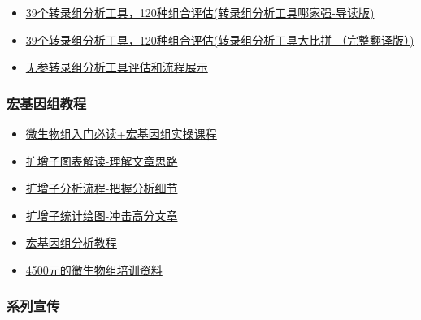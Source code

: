 \documentclass[]{article}
\providecommand{\tightlist}{%
  \setlength{\itemsep}{0pt}\setlength{\parskip}{0pt}}
\numberwithin{figure}{section}
\numberwithin{table}{section}
\begin{document}
\begin{itemize}
\tightlist
\item
  \href{http://mp.weixin.qq.com/s?__biz=MzI5MTcwNjA4NQ==\&mid=2247484106\&idx=1\&sn=687a0def51f6ea91a335754eb3dc9ca9\&chksm=ec0dc740db7a4e564e5b1e93a36e5d9447581e262eec9c2983d1d4e76788d673c9c07dec8f8e\#rd}{39个转录组分析工具，120种组合评估(转录组分析工具哪家强-导读版)}
\item
  \href{http://mp.weixin.qq.com/s?__biz=MzI5MTcwNjA4NQ==\&mid=2247484106\&idx=2\&sn=a09fa127d625c4072ae0343795346c56\&chksm=ec0dc740db7a4e56821f32f60700027c85db46e81089721d1bbe23ceefa86160d9661c2f2d4c\#rd}{39个转录组分析工具，120种组合评估(转录组分析工具大比拼 （完整翻译版）)}
\item
  \href{http://mp.weixin.qq.com/s/4HANWJY4oL7jGziroHfEpQ}{无参转录组分析工具评估和流程展示}
\end{itemize}

\hypertarget{ux5b8fux57faux56e0ux7ec4ux6559ux7a0b}{%
\subsubsection{宏基因组教程}\label{ux5b8fux57faux56e0ux7ec4ux6559ux7a0b}}

\begin{itemize}
\tightlist
\item
  \href{http://mp.weixin.qq.com/s/sQyl5EctXFB95Oxg8YIasg}{微生物组入门必读+宏基因组实操课程}
\item
  \href{http://mp.weixin.qq.com/s/oiVHO2S1JgYrKXPDU6fH2g}{扩增子图表解读-理解文章思路}
\item
  \href{http://mp.weixin.qq.com/s/KrYyy3jjzAL0rQzVfV6h4A}{扩增子分析流程-把握分析细节}
\item
  \href{http://mp.weixin.qq.com/s/6tNePiaDsPPzEBZjiCXIRg}{扩增子统计绘图-冲击高分文章}
\item
  \href{http://mp.weixin.qq.com/s/bcyvhFrNr6niqD13rQfZeg}{宏基因组分析教程}
\item
  \href{http://mp.weixin.qq.com/s/li7SdZVaCEyFQF8h6MMh2A}{4500元的微生物组培训资料}
\end{itemize}

\hypertarget{ux7cfbux5217ux5ba3ux4f20}{%
\subsubsection{系列宣传}\label{ux7cfbux5217ux5ba3ux4f20}}
\end{document}
